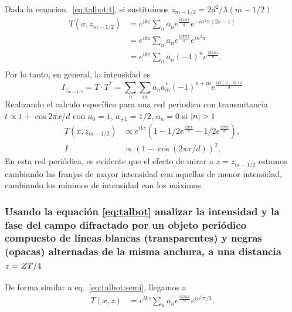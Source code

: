 \documentclass{./packages/optica-article}
\begin{document}
	      Dada la ecuacion.~\ref{eq:talbot:t}, si sustituímos $z_{m-1/2} = 2d^2/\lambda (m - 1/2)$
	      \nopagebreak
	      \begin{align*}
		      T(x,z_{m - 1/2}) & =
		      e^{ikz}
		      \sum_{n} a_n e^{\frac{i 2 \pi n x} {d}} e^{- i n^2 \pi (2s - 1)} \\
		             & =
		      e^{ikz}
		      \sum_{n} a_n e^{\frac{i 2 \pi n x} {d}} e^{ i n^2 \pi}           \\
		             & =
		      e^{ikz}
		      \sum_{n} a_n (-1)^{n}e^{\frac{i 2 \pi n x} {d}}.                 \\
	      \end{align*}
	      Por lo tanto, en general, la intensidad es
	      \begin{equation}\label{eq:talbot:semi}
		      I_{z_{m - 1/2}} = T \cdot T^{*}  =
		      \sum_{n} \sum_{m} a_n a_{m}^{*} (-1)^{n + m}e^{\frac{i 2 \pi (n - m)  x} {d}}
	      \end{equation}
	      Realizando el calculo específico para una red periodica con transmitancia $t \propto 1 + \cos{2\pi x / d}$  con $a_0=1$, $a_{\pm 1}=1/2$, $a_n = 0$ si $\abs{n} > 1$
	      \nopagebreak
	      \begin{align*}
		      T(x,z_{m-1/2}) & \propto
		      e^{ikz}\left(
		      1-1/2
		      e^{\frac{i 2 \pi  x} {d}}-1/2
		      e^{\frac{i 2 \pi  x} {d}}
		      \right),                 \\
		      I              & \propto
		      \left(
		      1-\cos (2 \pi  x / d)
		      \right)^{2},
	      \end{align*}
	      En esta red periódica, es evidente que el efecto de mirar a $z=z_{m-1/2}$ estamos cambiando las franjas de mayor intensidad con aquellas de menor intensidad, cambiando los mínimos de intensidad con los máximos.
	      
\subsubsection{ Usando la equación \ref{eq:talbot} analizar la intensidad y la fase del campo difractado por un objeto periódico compuesto de líneas blancas (transparentes) y negras (opacas) alternadas de la misma anchura, a una distancia $z=\flatfrac{ZT}{4}$
}
	      De forma similar a eq.~\ref{eq:talbot:semi}, llegamos a
	      \begin{align}
		      T(x,z) & =
		      e^{ikz}
		      \sum_{n} a_n e^{\frac{i 2 \pi n x} {d}}e^{i n^{2} \pi / 2}.
	      \end{align}
\end{document}
